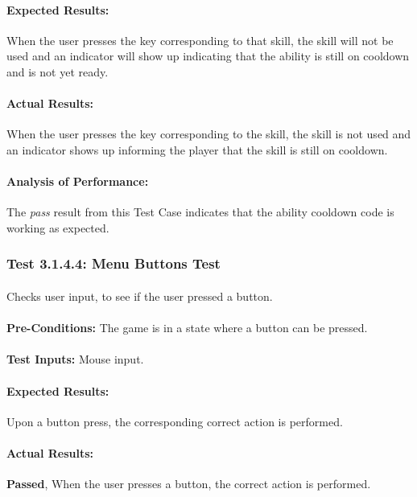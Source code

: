 \documentclass{article}
\begin{document}
    \paragraph{Expected Results:} When the user presses the key corresponding to that skill, the skill will not be used and an indicator will show up indicating that the ability is still on cooldown and is not yet ready.
    \paragraph{Actual Results:} When the user presses the key corresponding to the skill, the skill is not used and an indicator shows up informing the player that the skill is still on cooldown.
    \paragraph{Analysis of Performance:}The \emph{pass} result from this Test Case indicates that the ability cooldown code is working as expected.
    
    \subsubsection{Test 3.1.4.4: Menu Buttons Test}
    \paragraph{}\textbf{}
    \paragraph{}Checks user input, to see if the user pressed a button. 
    \paragraph{}\textbf{Pre-Conditions:} The game is in a state where a button can be pressed. 
    \paragraph{}\textbf{Test Inputs:} Mouse input.
    \paragraph{Expected Results:} Upon a button press, the corresponding correct action is performed.
    \paragraph{Actual Results:} \textbf{Passed}, When the user presses a button, the correct action is performed.
\end{document}

